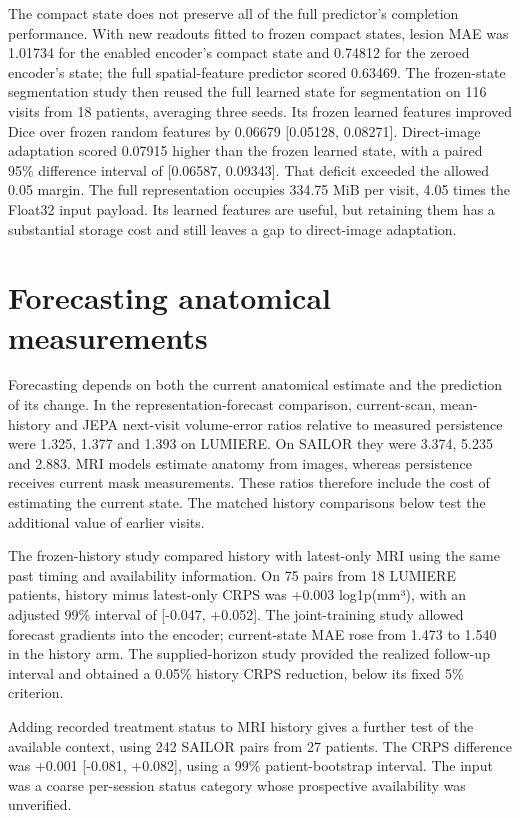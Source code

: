 The compact state does not preserve all of the full predictor's completion performance. With new readouts fitted to frozen compact states, lesion MAE was 1.01734 for the enabled encoder's compact state and 0.74812 for the zeroed encoder's state; the full spatial-feature predictor scored 0.63469. The frozen-state segmentation study then reused the full learned state for segmentation on 116 visits from 18 patients, averaging three seeds. Its frozen learned features improved Dice over frozen random features by 0.06679 [0.05128, 0.08271]. Direct-image adaptation scored 0.07915 higher than the frozen learned state, with a paired 95\% difference interval of [0.06587, 0.09343]. That deficit exceeded the allowed 0.05 margin. The full representation occupies 334.75 MiB per visit, 4.05 times the Float32 input payload. Its learned features are useful, but retaining them has a substantial storage cost and still leaves a gap to direct-image adaptation.

\section{Forecasting anatomical measurements}\label{sec:initial-results}

Forecasting depends on both the current anatomical estimate and the prediction of its change. In the representation-forecast comparison, current-scan, mean-history and JEPA next-visit volume-error ratios relative to measured persistence were 1.325, 1.377 and 1.393 on LUMIERE. On SAILOR they were 3.374, 5.235 and 2.883. MRI models estimate anatomy from images, whereas persistence receives current mask measurements. These ratios therefore include the cost of estimating the current state. The matched history comparisons below test the additional value of earlier visits.

The frozen-history study compared history with latest-only MRI using the same past timing and availability information. On 75 pairs from 18 LUMIERE patients, history minus latest-only CRPS was +0.003 log1p(mm³), with an adjusted 99\% interval of [-0.047, +0.052]. The joint-training study allowed forecast gradients into the encoder; current-state MAE rose from 1.473 to 1.540 in the history arm. The supplied-horizon study provided the realized follow-up interval and obtained a 0.05\% history CRPS reduction, below its fixed 5\% criterion.

Adding recorded treatment status to MRI history gives a further test of the available context, using 242 SAILOR pairs from 27 patients. The CRPS difference was +0.001 [-0.081, +0.082], using a 99\% patient-bootstrap interval. The input was a coarse per-session status category whose prospective availability was unverified.

